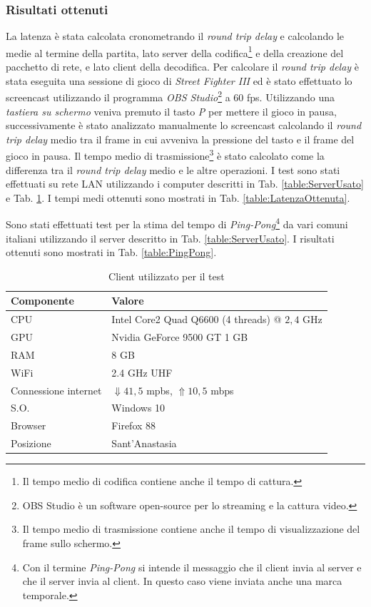\subsubsection{Risultati ottenuti}
La latenza è stata calcolata cronometrando il \textit{round trip delay} e calcolando le medie al termine della partita, lato server della codifica\footnote{Il tempo medio di codifica contiene anche il tempo di cattura.} e della creazione del pacchetto di rete, e lato client della decodifica. Per calcolare il \textit{round trip delay} è stata eseguita una sessione di gioco di \textit{Street Fighter III} ed è stato effettuato lo screencast utilizzando il programma \textit{OBS Studio}\footnote{OBS Studio è un software open-source per lo streaming e la cattura video.} a 60 fps. Utilizzando una \textit{tastiera su schermo} veniva premuto il tasto \textit{P} per mettere il gioco in pausa, successivamente è stato analizzato manualmente lo screencast calcolando il \textit{round trip delay} medio tra il frame in cui avveniva la pressione del tasto e il frame del gioco in pausa. Il tempo medio di trasmissione\footnote{Il tempo medio di trasmissione contiene anche il tempo di visualizzazione del frame sullo schermo.} è stato calcolato come la differenza tra il \textit{round trip delay} medio e le altre operazioni. I test sono stati effettuati su rete LAN utilizzando i computer descritti in Tab. \ref{table:ServerUsato} e Tab. \ref{table:ClientUsato}. I tempi medi ottenuti sono mostrati in Tab. \ref{table:LatenzaOttenuta}.

Sono stati effettuati test per la stima del tempo di \textit{Ping-Pong}\footnote{Con il termine \textit{Ping-Pong} si intende il messaggio che il client invia al server e che il server invia al client. In questo caso viene inviata anche una marca temporale.} da vari comuni italiani utilizzando il server descritto in Tab. \ref{table:ServerUsato}. I risultati ottenuti sono mostrati in Tab. \ref{table:PingPong}.

\begin{table}[H]
	\centering
	\begin{tabular}{||l l||}
		\hline
		Componente & Valore \\
		\hline\hline				
		\hline
		CPU & Intel Core2 Quad Q6600 (4 threads) @ $2,4$ GHz \\
		\hline
		GPU & Nvidia GeForce 9500 GT 1 GB\\
		\hline
		RAM & 8 GB \\
		\hline		
		WiFi & 2.4 GHz UHF \\
		\hline		
		Connessione internet & $\Downarrow 41,5$ mpbs, $\Uparrow 10,5$ mbps \\
		\hline
		S.O. & Windows 10 \\
		\hline
		Browser & Firefox 88 \\
		\hline
		Posizione & Sant'Anastasia \\
		\hline
	\end{tabular}

	\caption{Client utilizzato per il test}
	\label{table:ClientUsato}
\end{table}

